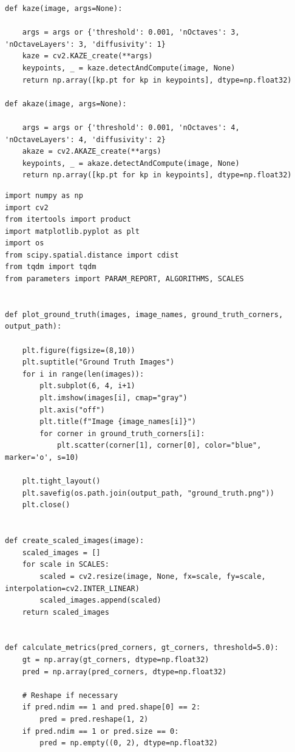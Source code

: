 \documentclass[journal]{IEEEtran}
\begin{document}
\begin{lstlisting}[style=python, caption={All Corner Detection Wrappers}, label={lst:corner_methods}]
def kaze(image, args=None):

    args = args or {'threshold': 0.001, 'nOctaves': 3, 'nOctaveLayers': 3, 'diffusivity': 1}
    kaze = cv2.KAZE_create(**args)
    keypoints, _ = kaze.detectAndCompute(image, None)
    return np.array([kp.pt for kp in keypoints], dtype=np.float32)

def akaze(image, args=None):

    args = args or {'threshold': 0.001, 'nOctaves': 4, 'nOctaveLayers': 4, 'diffusivity': 2}
    akaze = cv2.AKAZE_create(**args)
    keypoints, _ = akaze.detectAndCompute(image, None)
    return np.array([kp.pt for kp in keypoints], dtype=np.float32)
\end{lstlisting}
\bigskip
\bigskip

\begin{lstlisting}[style=python, caption={Utility Functions for Data Processing}, label={lst:utilities}]
import numpy as np
import cv2
from itertools import product
import matplotlib.pyplot as plt
import os
from scipy.spatial.distance import cdist
from tqdm import tqdm
from parameters import PARAM_REPORT, ALGORITHMS, SCALES


def plot_ground_truth(images, image_names, ground_truth_corners, output_path):
    
    plt.figure(figsize=(8,10))
    plt.suptitle("Ground Truth Images")
    for i in range(len(images)):
        plt.subplot(6, 4, i+1)
        plt.imshow(images[i], cmap="gray")
        plt.axis("off")
        plt.title(f"Image {image_names[i]}")
        for corner in ground_truth_corners[i]:
            plt.scatter(corner[1], corner[0], color="blue", marker='o', s=10)
            
    plt.tight_layout()
    plt.savefig(os.path.join(output_path, "ground_truth.png"))
    plt.close()


def create_scaled_images(image):
    scaled_images = []
    for scale in SCALES:
        scaled = cv2.resize(image, None, fx=scale, fy=scale, interpolation=cv2.INTER_LINEAR)
        scaled_images.append(scaled)
    return scaled_images


def calculate_metrics(pred_corners, gt_corners, threshold=5.0):
    gt = np.array(gt_corners, dtype=np.float32)
    pred = np.array(pred_corners, dtype=np.float32)

    # Reshape if necessary
    if pred.ndim == 1 and pred.shape[0] == 2:
        pred = pred.reshape(1, 2)
    if pred.ndim == 1 or pred.size == 0:
        pred = np.empty((0, 2), dtype=np.float32)


\end{lstlisting}
\end{document}
